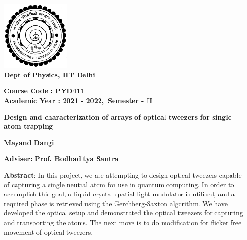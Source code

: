 \thispagestyle{empty}
\vspace*{0.6cm}
\begin{center}
 \includegraphics[height=3.5cm,angle=0]{Logo-IITD.jpg}\\
\textbf{Dept of Physics, IIT Delhi}
\end{center}

\vspace*{0.8cm}
\begin{center}
\textbf{Course Code : PYD411}\\
\textbf{Academic Year : 2021 - 2022,\, Semester - II}\\
\end{center}

\vspace*{0.8cm}
\begin{center}
\textbf{\LARGE{Design and characterization of arrays of optical tweezers for single atom trapping}}\\
\end{center}

\vspace*{0.8cm}
\begin{center}
\textbf{\Large{Mayand Dangi}}\\
\end{center}

\vspace*{0.8cm}
\begin{center}
\textbf{\Large{Adviser: Prof. Bodhaditya Santra}}\\
\end{center}

\vspace*{1.5cm}
\noindent
\textbf{Abstract}: In this project, we are attempting to design optical tweezers capable of capturing a single neutral atom for use in quantum computing. In order to accomplish this goal, a liquid-crystal spatial light modulator is utilised, and a required phase is retrieved using the Gerchberg-Saxton algorithm. We have developed the optical setup and demonstrated the optical tweezers for capturing and transporting the atoms. The next move is to do modification for flicker free movement of optical tweezers.



